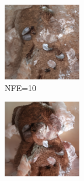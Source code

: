 \documentclass{article}
\begin{document}
\begin{figure}
    \begin{subfigure}[b]{0.5\linewidth}
        \begin{subfigure}[b]{0.242\linewidth}
        \includegraphics[width=\linewidth]{figures/imagenet128/solver_samples/imagenet128_fm_ot_374_05.png}
        \caption*{NFE=10}
        \end{subfigure}%
        \begin{subfigure}[b]{0.242\linewidth}
        \includegraphics[width=\linewidth]{figures/imagenet128/solver_samples/imagenet128_fm_ot_374_10.png}

\end{subfigure}
\end{subfigure}
\end{figure}
\end{document}
